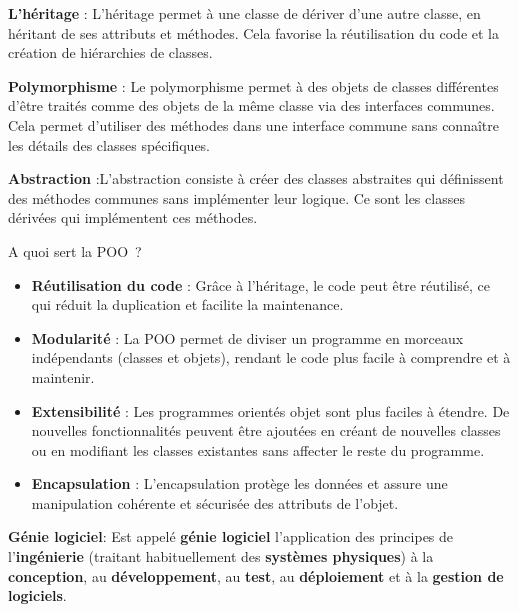 \vspace{0.5cm}

\noindent \textbf{L'héritage} : L'héritage permet à une classe de dériver d'une autre classe, en héritant de ses attributs et méthodes. Cela favorise la réutilisation du code et la création de hiérarchies de classes.

\vspace{0.5cm}

\noindent \textbf{Polymorphisme} : Le polymorphisme permet à des objets de classes différentes d'être traités comme des objets de la même classe via des interfaces communes. Cela permet d'utiliser des méthodes dans une interface commune sans connaître les détails des classes spécifiques.

\vspace{0.5cm}

\noindent \textbf{Abstraction} :L'abstraction consiste à créer des classes abstraites qui définissent des méthodes communes sans implémenter leur logique. Ce sont les classes dérivées qui implémentent ces méthodes.

\vspace{0.5cm}

\noindent A quoi sert la POO~?

\begin{itemize}
	\item \textbf{Réutilisation du code} : Grâce à l'héritage, le code peut être réutilisé, ce qui réduit la duplication et facilite la maintenance.
	\item \textbf{Modularité} : La POO permet de diviser un programme en morceaux indépendants (classes et objets), rendant le code plus facile à comprendre et à maintenir.
    \item \textbf{Extensibilité} : Les programmes orientés objet sont plus faciles à étendre. De nouvelles fonctionnalités peuvent être ajoutées en créant de nouvelles classes ou en modifiant les classes existantes sans affecter le reste du programme.
    \item \textbf{Encapsulation} : L'encapsulation protège les données et assure une manipulation cohérente et sécurisée des attributs de l'objet.
\end{itemize}

\newpage

\noindent \textbf{Génie logiciel}:
\noindent Est appelé \textbf{génie logiciel} l'application des principes de l'\textbf{ingénierie} (traitant habituellement des \textbf{systèmes physiques}) à la \textbf{conception}, au \textbf{développement}, au \textbf{test}, au \textbf{déploiement} et à la \textbf{gestion de logiciels}.

